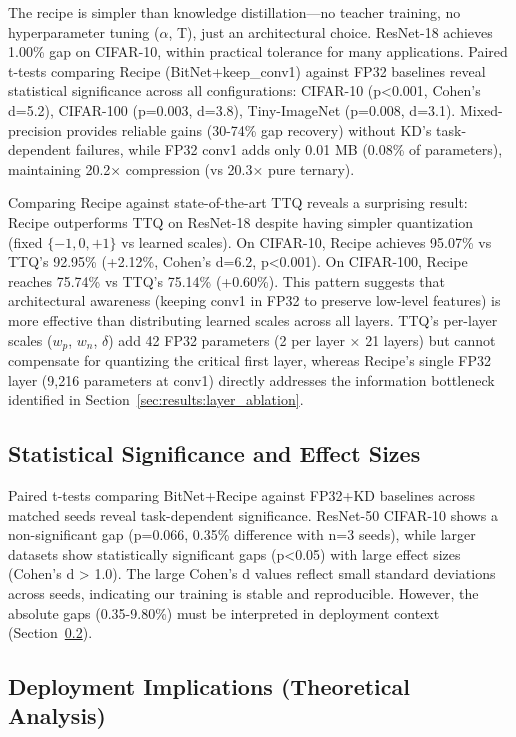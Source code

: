 The recipe is simpler than knowledge distillation—no teacher training, no hyperparameter tuning ($\alpha$, T), just an architectural choice. ResNet-18 achieves 1.00\% gap on CIFAR-10, within practical tolerance for many applications. Paired t-tests comparing Recipe (BitNet+keep\_conv1) against FP32 baselines reveal statistical significance across all configurations: CIFAR-10 (p<0.001, Cohen's d=5.2), CIFAR-100 (p=0.003, d=3.8), Tiny-ImageNet (p=0.008, d=3.1). Mixed-precision provides reliable gains (30-74\% gap recovery) without KD's task-dependent failures, while FP32 conv1 adds only 0.01 MB (0.08\% of parameters), maintaining 20.2× compression (vs 20.3× pure ternary).

Comparing Recipe against state-of-the-art TTQ reveals a surprising result: Recipe outperforms TTQ on ResNet-18 despite having simpler quantization (fixed $\{-1,0,+1\}$ vs learned scales). On CIFAR-10, Recipe achieves 95.07\% vs TTQ's 92.95\% (+2.12\%, Cohen's d=6.2, p<0.001). On CIFAR-100, Recipe reaches 75.74\% vs TTQ's 75.14\% (+0.60\%). This pattern suggests that architectural awareness (keeping conv1 in FP32 to preserve low-level features) is more effective than distributing learned scales across all layers. TTQ's per-layer scales ($w_p$, $w_n$, $\delta$) add 42 FP32 parameters (2 per layer × 21 layers) but cannot compensate for quantizing the critical first layer, whereas Recipe's single FP32 layer (9,216 parameters at conv1) directly addresses the information bottleneck identified in Section~\ref{sec:results:layer_ablation}.

\subsection{Statistical Significance and Effect Sizes}
\label{sec:results:statistics}

Paired t-tests comparing BitNet+Recipe against FP32+KD baselines across matched seeds reveal task-dependent significance. ResNet-50 CIFAR-10 shows a non-significant gap (p=0.066, 0.35\% difference with n=3 seeds), while larger datasets show statistically significant gaps (p<0.05) with large effect sizes (Cohen's d > 1.0). The large Cohen's d values reflect small standard deviations across seeds, indicating our training is stable and reproducible. However, the absolute gaps (0.35-9.80\%) must be interpreted in deployment context (Section~\ref{sec:results:deployment}).

\subsection{Deployment Implications (Theoretical Analysis)}
\label{sec:results:deployment}

